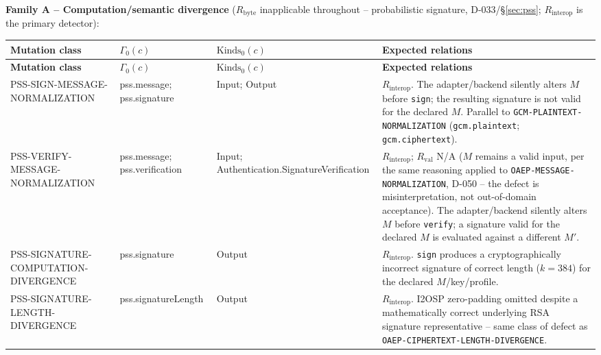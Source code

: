 \documentclass[11pt,a4paper]{article}
\begin{document}
\textbf{Family A -- Computation/semantic divergence} ($R_{\text{byte}}$ inapplicable throughout -- probabilistic signature, D-033/\S\ref{sec:pss}; $R_{\text{interop}}$ is the primary detector):
\begin{longtable}{p{}p{}p{}p{}}
\toprule
\textbf{Mutation class} & \textbf{$\Gamma_0(c)$} & \textbf{$\text{Kinds}_0(c)$} & \textbf{Expected relations}\\
\midrule\endfirsthead
\toprule
\textbf{Mutation class} & \textbf{$\Gamma_0(c)$} & \textbf{$\text{Kinds}_0(c)$} & \textbf{Expected relations}\\
\midrule\endhead
PSS-SIGN-MESSAGE-NORMALIZATION & pss.message; pss.signature & Input; Output & $R_{\text{interop}}$. The adapter/backend silently alters $M$ before \texttt{sign}; the resulting signature is not valid for the declared $M$. Parallel to \texttt{GCM-PLAINTEXT-NORMALIZATION} (\texttt{gcm.plaintext}; \texttt{gcm.ciphertext}).\\
PSS-VERIFY-MESSAGE-NORMALIZATION & pss.message; pss.verification & Input; Authentication.SignatureVerification & $R_{\text{interop}}$; $R_{\text{val}}$ N/A ($M$ remains a valid input, per the same reasoning applied to \texttt{OAEP-MESSAGE-NORMALIZATION}, D-050 -- the defect is misinterpretation, not out-of-domain acceptance). The adapter/backend silently alters $M$ before \texttt{verify}; a signature valid for the declared $M$ is evaluated against a different $M'$.\\
PSS-SIGNATURE-COMPUTATION-DIVERGENCE & pss.signature & Output & $R_{\text{interop}}$. \texttt{sign} produces a cryptographically incorrect signature of correct length ($k=384$) for the declared $M$/key/profile.\\
PSS-SIGNATURE-LENGTH-DIVERGENCE & pss.signatureLength & Output & $R_{\text{interop}}$. I2OSP zero-padding omitted despite a mathematically correct underlying RSA signature representative -- same class of defect as \texttt{OAEP-CIPHERTEXT-LENGTH-DIVERGENCE}.\\
\bottomrule
\end{longtable}
\end{document}
